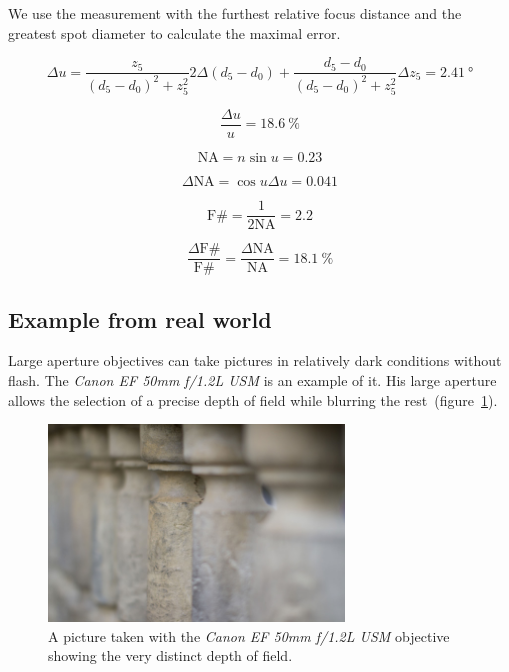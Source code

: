 \documentclass[a4paper, 12pt]{paper}
\begin{document}
We use the measurement with the furthest relative focus distance and the greatest spot diameter to calculate the maximal error.

\begin{equation}
    \Delta u = \frac{z_5}{{\left(d_5-d_0\right)}^2 + z_5^2} 2 \Delta \left(d_5-d_0\right)
    + \frac{d_5-d_0}{{\left(d_5-d_0\right)}^2 + z_5^2} \Delta z_5 = \SI{2.41}{\degree}
    \label{equ:acceptance_angle_err}
\end{equation}

\begin{equation}
    \frac{\Delta u}{u} = \SI{18.6}{\percent}
    \label{equ:acceptance_angle_err_percent}
\end{equation}

\begin{equation}
    \mbox{NA} = n \sin{u} = 0.23
    \label{equ:numerical_aperture}
\end{equation}

\begin{equation}
    \Delta \mbox{NA} = \cos{u} \Delta u = 0.041
    \label{equ:numerical_aperture_err}
\end{equation}

\begin{equation}
    \mbox{F\#} = \frac{1}{2 \mbox{NA}} = 2.2
    \label{equ:f_number}
\end{equation}

\begin{equation}
    \frac{\Delta \mbox{F\#}}{\mbox{F\#}} = \frac{\Delta \mbox{NA}}{\mbox{NA}}
        = \SI{18.1}{\percent}
    \label{equ:f_number_err_precent}
\end{equation}

\subsection{Example from real world}

Large aperture objectives can take pictures in relatively dark conditions without flash. 
The \emph{Canon EF 50mm f/1.2L USM} is an example of it. 
His large aperture allows the selection of a precise depth of field while blurring the rest~(figure~\ref{fig:real_world}).

\begin{figure}[H]
    \centering
    \includegraphics[width=0.7\textwidth]{img/real_world.jpg}
    \caption{A picture taken with the \emph{Canon EF 50mm f/1.2L USM} objective showing the very distinct depth of field.}
\label{fig:real_world}
\end{figure}
\end{document}
